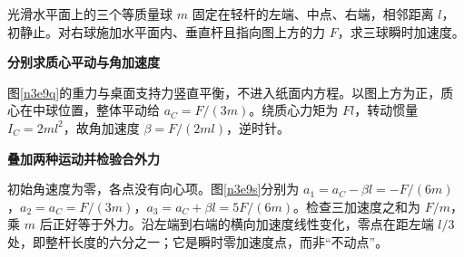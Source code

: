 \begin{question}\begin{example}[水平面内轻杆三球的横向响应]\label{n3e9}
光滑水平面上的三个等质量球 $m$ 固定在轻杆的左端、中点、右端，相邻距离 $l$，初静止。对右球施加水平面内、垂直杆且指向图上方的力 $F$，求三球瞬时加速度。
\end{example}\end{question}
\begin{solution}\textbf{分别求质心平动与角加速度}\par\nobreak
图\ref{n3e9q}的重力与桌面支持力竖直平衡，不进入纸面内方程。以图上方为正，质心在中球位置，整体平动给 $a_C=F/(3m)$。绕质心力矩为 $Fl$，转动惯量 $I_C=2ml^2$，故角加速度 $\beta=F/(2ml)$，逆时针。


\par\medskip{}\noindent\textbf{叠加两种运动并检验合外力}\par\nobreak
初始角速度为零，各点没有向心项。图\ref{n3e9s}分别为 $a_1=a_C-\beta l=-F/(6m)$，$a_2=a_C=F/(3m)$，$a_3=a_C+\beta l=5F/(6m)$。检查三加速度之和为 $F/m$，乘 $m$ 后正好等于外力。沿左端到右端的横向加速度线性变化，零点在距左端 $l/3$ 处，即整杆长度的六分之一；它是瞬时零加速度点，而非“不动点”。
\end{solution}

